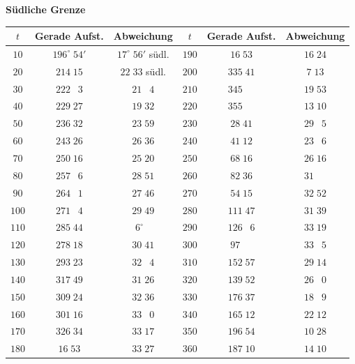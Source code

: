 \documentclass[12pt,a4paper]{article}
\begin{document}
\vspace{1em}
\begin{center}
\small
\textbf{Südliche Grenze}\\[4pt]
\begin{tabular}{|c|c|c||c|c|c|}
\hline
$t$ & Gerade Aufst. & Abweichung & $t$ & Gerade Aufst. & Abweichung \\
\hline
$10$ & $196^{\circ}\;54'$ & $17^{\circ}\;56'$ südl.
& $190$ & $16\;53$ & $16\;24$\\
$20$ & $214\;15$ & $22\;33$ südl.
& $200$ & $335\;41$ & $7\;13$\\
$30$ & $222\;\phantom{0}3$ & $21\;\phantom{0}4$ 
& $210$ & $345\;\phantom{0}\phantom{0}$ & $19\;53$\\
$40$ & $229\;27$ & $19\;32$ 
& $220$ & $355\;\phantom{0}\phantom{0}$ & $13\;10$\\
$50$ & $236\;32$ & $23\;59$ 
& $230$ & $28\;41$ & $29\;\phantom{0}5$\\
$60$ & $243\;26$ & $26\;36$ 
& $240$ & $41\;12$ & $23\;\phantom{0}6$\\
$70$ & $250\;16$ & $25\;20$ 
& $250$ & $68\;16$ & $26\;16$\\
$80$ & $257\;\phantom{0}6$ & $28\;51$ 
& $260$ & $82\;36$ & $31\;\phantom{0}\phantom{0}$\\
$90$ & $264\;\phantom{0}1$ & $27\;46$ 
& $270$ & $54\;15$ & $32\;52$\\
$100$ & $271\;\phantom{0}4$ & $29\;49$ 
& $280$ & $111\;47$ & $31\;39$\\
$110$ & $285\;44$ & $6^{\circ}\;\phantom{0}$ 
& $290$ & $126\;\phantom{0}6$ & $33\;19$\\
$120$ & $278\;18$ & $30\;41$ 
& $300$ & $97\;\phantom{0}\phantom{0}$ & $33\;\phantom{0}5$\\
$130$ & $293\;23$ & $32\;\phantom{0}4$ 
& $310$ & $152\;57$ & $29\;14$\\
$140$ & $317\;49$ & $31\;26$ 
& $320$ & $139\;52$ & $26\;\phantom{0}0$\\
$150$ & $309\;24$ & $32\;36$ 
& $330$ & $176\;37$ & $18\;\phantom{0}9$\\
$160$ & $301\;16$ & $33\;\phantom{0}0$ 
& $340$ & $165\;12$ & $22\;12$\\
$170$ & $326\;34$ & $33\;17$ 
& $350$ & $196\;54$ & $10\;28$\\
$180$ & $16\;53$ & $33\;27$ 
& $360$ & $187\;10$ & $14\;10$\\
\hline
\end{tabular}
\end{center}
\end{document}
